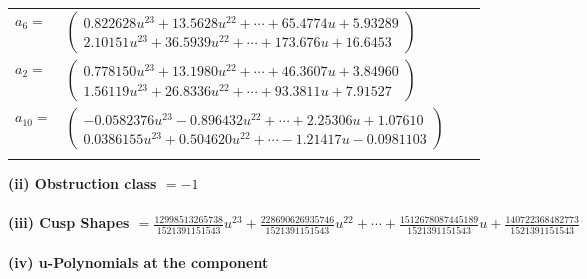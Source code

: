 \documentclass[1p]{elsarticle_modified}
\theoremstyle{definition}
\begin{document}
\begin{tabular}{m{7pt} m{180pt} m{7pt} m{180pt} }
\flushright $a_{6}=$&$\begin{pmatrix}0.822628 u^{23}+13.5628 u^{22}+\cdots+65.4774 u+5.93289\\2.10151 u^{23}+36.5939 u^{22}+\cdots+173.676 u+16.6453\end{pmatrix}$ \\
\flushright $a_{2}=$&$\begin{pmatrix}0.778150 u^{23}+13.1980 u^{22}+\cdots+46.3607 u+3.84960\\1.56119 u^{23}+26.8336 u^{22}+\cdots+93.3811 u+7.91527\end{pmatrix}$ \\
\flushright $a_{10}=$&$\begin{pmatrix}-0.0582376 u^{23}-0.896432 u^{22}+\cdots+2.25306 u+1.07610\\0.0386155 u^{23}+0.504620 u^{22}+\cdots-1.21417 u-0.0981103\end{pmatrix}$\\&\end{tabular}
\flushleft \textbf{(ii) Obstruction class $= -1$}\\~\\
\flushleft \textbf{(iii) Cusp Shapes $= \frac{12998513265738}{1521391151543} u^{23}+\frac{228690626935746}{1521391151543} u^{22}+\cdots+\frac{1512678087445189}{1521391151543} u+\frac{140722368482773}{1521391151543}$}\\~\\
\newpage\renewcommand{\arraystretch}{1}
\flushleft \textbf{(iv) u-Polynomials at the component}\newline \\
\end{document}
